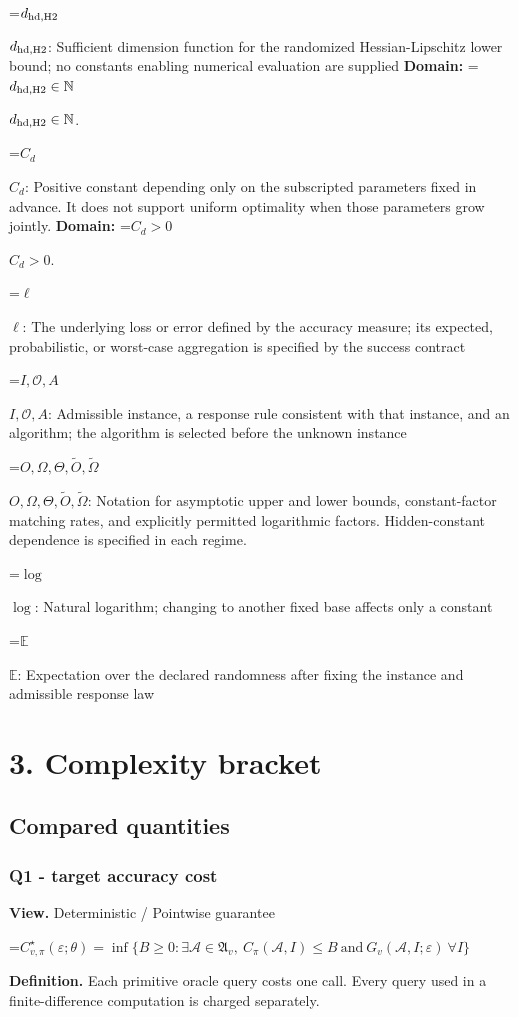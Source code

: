 \documentclass[10pt,a4paper]{article}
\newcommand{\AtlasMath}[1]{\par\begingroup\centering\setbox0=\hbox{$\displaystyle #1$}\ifdim\wd0>1.4\linewidth\typeout{ATLAS WIDE FORMULA: \the\wd0}\fi\ifdim\wd0>\linewidth\resizebox{\linewidth}{!}{\box0}\else\box0\fi\par\endgroup}
\newcommand{\AtlasInlineMath}[1]{\begingroup\setbox0=\hbox{$#1$}\ifdim\wd0>.4\linewidth\endgroup\AtlasMath{#1}\else\endgroup$#1$\fi}
\begin{document}
\AtlasInlineMath{d_{\rm hd,H2}}: Sufficient dimension function for the randomized Hessian-Lipschitz lower bound; no constants enabling numerical evaluation are supplied \textbf{Domain:} \AtlasInlineMath{d_{\rm hd,H2}\in\mathbb{N}}.

\AtlasInlineMath{C_d}: Positive constant depending only on the subscripted parameters fixed in advance. It does not support uniform optimality when those parameters grow jointly. \textbf{Domain:} \AtlasInlineMath{C_d>0}.

\AtlasInlineMath{\ell}: The underlying loss or error defined by the accuracy measure; its expected, probabilistic, or worst-case aggregation is specified by the success contract

\AtlasInlineMath{I,\mathcal{O},A}: Admissible instance, a response rule consistent with that instance, and an algorithm; the algorithm is selected before the unknown instance

\AtlasInlineMath{O,\Omega,\Theta,\widetilde{O},\widetilde\Omega}: Notation for asymptotic upper and lower bounds, constant-factor matching rates, and explicitly permitted logarithmic factors. Hidden-constant dependence is specified in each regime.

\AtlasInlineMath{\log}: Natural logarithm; changing to another fixed base affects only a constant

\AtlasInlineMath{\mathbb{E}}: Expectation over the declared randomness after fixing the instance and admissible response law

\section{3. Complexity bracket}
\subsection{Compared quantities}
\subsubsection{Q1 - target accuracy cost}
\textbf{View.} Deterministic / Pointwise guarantee

\AtlasMath{C^\star_{v,\pi}(\varepsilon;\theta)=\inf\{B\ge0:\exists\mathcal A\in\mathfrak A_v,\ C_\pi(\mathcal A,I)\le B\ \text{and}\ G_v(\mathcal A,I;\varepsilon)\ \forall I\}}
\textbf{Definition.} Each primitive oracle query costs one call. Every query used in a finite-difference computation is charged separately.
\end{document}
